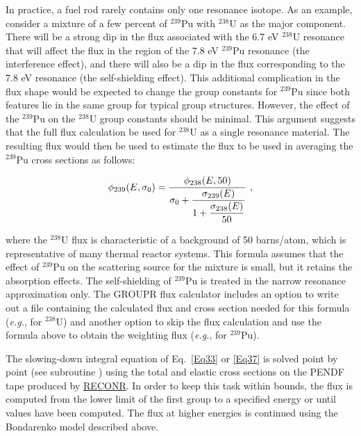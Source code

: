 In practice, a fuel rod rarely contains only one resonance isotope.
As an example, consider a mixture of a few percent of $^{239}$Pu
with $^{238}$U as the major component.  There will be a strong dip in the
flux associated with the 6.7 eV $^{238}$U resonance that will affect the
flux in the region of the 7.8 eV $^{239}$Pu resonance (the interference
effect), and there will also be a dip in the flux corresponding to the
7.8 eV resonance (the self-shielding effect).  This additional
complication in the flux shape would be expected to change the group
constants for $^{239}$Pu since both features lie in the same group for
typical group structures.  However, the effect of the $^{239}$Pu on the
$^{238}$U group constants should be minimal.  This argument suggests that
the full flux calculation be used for $^{238}$U as a single resonance
material.  The resulting flux would then be used to estimate the flux
to be used in averaging the $^{239}$Pu cross sections as follows:

  \begin{equation}
    \phi_{239}(E,\sigma_0)={\displaystyle{\phi_{238}(E,50)}\over
    \displaystyle \sigma_0+{\displaystyle{\sigma_{239}(E)}\over\displaystyle
    {1+{\displaystyle{\sigma_{238}(E)\over\displaystyle 50}}}}}\,\,,
  \label{Eq38}
  \end{equation}
\vspace{0.5 pt}

\noindent
where the $^{238}$U flux is characteristic of a background of 50
barns/atom, which is representative of many thermal reactor systems.
This formula assumes that the effect of $^{239}$Pu on the scattering source
for the mixture is small, but it retains the absorption effects.  The
self-shielding of $^{239}$Pu is treated in the narrow resonance
approximation only.  The GROUPR flux calculator includes an option to
write out a file containing the calculated flux and cross section
needed for this formula ({\it e.g.}, for $^{238}$U) and another option
to skip the flux calculation and use the formula above to obtain the
weighting flux ({\it e.g.}, for $^{239}$Pu).

The slowing-down integral equation of Eq.~\ref{Eq33} or \ref{Eq37}
is solved point by point (see subroutine ) using the
total and elastic cross sections on the PENDF tape produced by
\hyperlink{sRECONRhy}{RECONR}.
In order to keep this task within bounds, the flux is computed from the
lower limit of the first group to a specified energy  or
until  values have been computed.  The flux at higher
energies is continued using the Bondarenko model described above.

